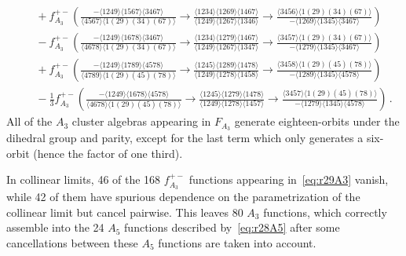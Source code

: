\documentclass[11pt]{article}
\begin{document}
\begin{align}
&\quad+ f_{A_3}^{+-} \left( \tfrac{ - \langle 1249 \rangle \langle 1567 \rangle \langle 3467 \rangle}{\langle 4567 \rangle \langle 1(29)(34)(67) \rangle} \! 
    \to \! \tfrac{\langle 1234 \rangle \langle 1269 \rangle \langle 1467 \rangle}{\langle 1249 \rangle \langle 1267 \rangle \langle 1346 \rangle} \! 
    \to \! \tfrac{\langle 3456 \rangle  \langle 1(29)(34)(67) \rangle}{ - \langle 1269 \rangle \langle 1345 \rangle \langle 3467 \rangle} \right) \nonumber \\
&\quad- f_{A_3}^{+-} \left( \tfrac{ - \langle 1249 \rangle \langle 1678 \rangle \langle 3467 \rangle}{\langle 4678 \rangle \langle 1(29)(34)(67) \rangle} \! 
    \to \! \tfrac{\langle 1234 \rangle \langle 1279 \rangle \langle 1467 \rangle}{\langle 1249 \rangle \langle 1267 \rangle \langle 1347 \rangle} \! 
    \to \! \tfrac{\langle 3457 \rangle \langle 1(29)(34)(67) \rangle}{ - \langle 1279 \rangle \langle 1345 \rangle \langle 3467 \rangle} \right) \nonumber \\
&\quad+ f_{A_3}^{+-} \left( \tfrac{ - \langle 1249 \rangle \langle 1789 \rangle \langle 4578 \rangle}{\langle 4789 \rangle \langle 1(29)(45)(78) \rangle} \! 
    \to \! \tfrac{\langle 1245 \rangle \langle 1289 \rangle \langle 1478 \rangle}{\langle 1249 \rangle \langle 1278 \rangle \langle 1458 \rangle } \! 
    \to \! \tfrac{\langle 3458 \rangle \langle 1(29)(45)(78) \rangle}{ - \langle 1289 \rangle \langle 1345 \rangle \langle 4578 \rangle} \right) \nonumber \\
&\quad- \tfrac{1}{3} f_{A_3}^{+-} \left( \tfrac{ - \langle 1249 \rangle \langle 1678 \rangle \langle 4578 \rangle}{\langle 4678 \rangle \langle 1(29)(45)(78) \rangle} \! 
    \to \! \tfrac{\langle 1245 \rangle \langle 1279 \rangle \langle 1478 \rangle}{\langle 1249 \rangle \langle 1278 \rangle \langle 1457 \rangle} \! 
    \to \! \tfrac{\langle 3457 \rangle \langle 1(29)(45)(78) \rangle}{ - \langle 1279 \rangle \langle 1345 \rangle \langle 4578 \rangle} \right) \, . \nonumber 
\end{align}
All of the $A_3$ cluster algebras appearing in $F_{A_3}$ generate eighteen-orbits under the dihedral group and parity, except for the last term which only generates a six-orbit (hence the factor of one third). 

In collinear limits, 46 of the 168 $f_{A_3}^{+-}$ functions appearing in~\eqref{eq:r29A3} vanish, while 42 of them have spurious dependence on the parametrization of the collinear limit but cancel pairwise. This leaves 80 $A_3$ functions, which correctly assemble into the 24 $A_5$ functions described by~\eqref{eq:r28A5} after some cancellations between these $A_5$ functions are taken into account.
\end{document}
